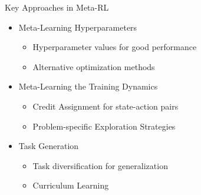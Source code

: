 \documentclass[aspectratio=169]{../latex_main/tntbeamer}  %
\begin{document}
\begin{frame}[c]{Key Approaches in Meta-RL}
	
	\begin{itemize}
		\item Meta-Learning Hyperparameters
		\begin{itemize}
			\item Hyperparameter values for good performance
			\item Alternative optimization methods
		\end{itemize}
		\item Meta-Learning the Training Dynamics
		\begin{itemize}
			\item Credit Assignment for state-action pairs
			\item Problem-specific Exploration Strategies
		\end{itemize}
		\item Task Generation
		\begin{itemize}
			\item Task diversification for generalization
			\item Curriculum Learning
		\end{itemize}
	\end{itemize}
	
	
\end{frame}
\end{document}
